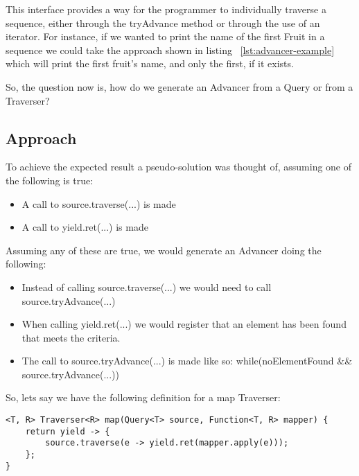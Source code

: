 

This interface provides a way for the programmer to individually traverse a sequence, either through the tryAdvance method or through the use of an iterator. For instance, if we wanted to print the name of the first Fruit in a sequence we could take the approach shown in listing ~\ref{lst:advancer-example} which will print the first fruit's name, and only the first, if it exists.



So, the question now is, how do we generate an Advancer from a Query or from a Traverser?


\subsection{Approach}

To achieve the expected result a pseudo-solution was thought of, assuming one of the following is true:
\begin{itemize}
\item A call to source.traverse(...) is made
\item A call to yield.ret(...) is made
\end{itemize}


Assuming any of these are true, we would generate an Advancer doing the following:
\begin{itemize}
\item Instead of calling source.traverse(...) we would need to call source.tryAdvance(...)
\item When calling yield.ret(...) we would register that an element has been found that meets the criteria.
\item The call to source.tryAdvance(...) is made like so: while(noElementFound \&\& source.tryAdvance(...))
\end{itemize}

So, lets say we have the following definition for a map Traverser:
\begin{lstlisting}[caption={Map Traverser},label={lst:map-traverser},captionpos=b]
<T, R> Traverser<R> map(Query<T> source, Function<T, R> mapper) {
	return yield -> {
    	source.traverse(e -> yield.ret(mapper.apply(e)));
	};
}
\end{lstlisting}

